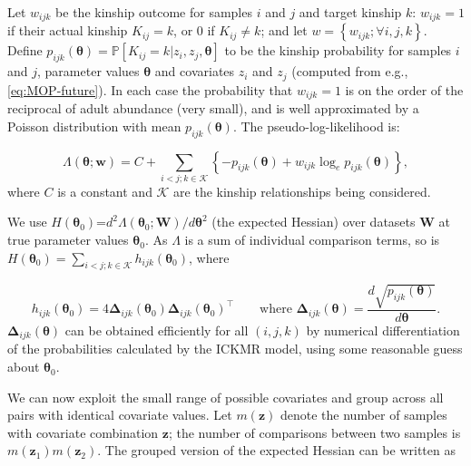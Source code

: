 Let $w_{ijk}$ be the kinship outcome for samples $i$ and $j$ and
target kinship $k$: $w_{ijk}=1$ if their actual kinship $K_{ij}=k$,
or 0 if $K_{ij}\neq k$; and let $w=\left\{ w_{ijk};\forall i,j,k\right\} $.
Define $p_{ijk}\left(\boldsymbol{\theta}\right)=\mathbb{P}\left[K_{ij}=k\vert z_{i},z_{j},\boldsymbol{\theta}\right]$
to be the kinship probability for samples $i$ and $j$, parameter
values $\boldsymbol{\theta}$ and covariates $z_{i}$ and $z_{j}$
(computed from e.g., \eqref{eq:MOP-future}). In each case the probability
that $w_{ijk}=1$ is on the order of the reciprocal of adult abundance
(very small), and is well approximated by a Poisson distribution with
mean $p_{ijk}\left(\boldsymbol{\theta}\right)$. The pseudo-log-likelihood
is:

\[
\Lambda\left(\boldsymbol{\theta};\mathbf{w}\right)=C+\sum_{i<j;k\in\mathcal{K}}\left\{ -p_{ijk}\left(\boldsymbol{\theta}\right)+w_{ijk}\log_{e}p_{ijk}\left(\boldsymbol{\theta}\right)\right\} ,
\]
where $C$ is a constant and $\mathcal{K}$ are the kinship relationships
being considered.

We use $H\left(\boldsymbol{\theta}_{0}\right)$=$d^{2}\Lambda\left(\boldsymbol{\theta}_{0};\mathbf{W}\right)/d\boldsymbol{\theta}^{2}$
(the expected Hessian) over datasets $\mathbf{W}$ at true parameter
values $\boldsymbol{\theta}_{0}$. As $\Lambda$ is a sum of individual
comparison terms, so is $H\left(\boldsymbol{\theta}_{0}\right)=\sum_{i<j;k\in\mathcal{K}}h_{ijk}\left(\boldsymbol{\theta}_{0}\right)$,
where

\[
h_{ijk}\left(\boldsymbol{\theta}_{0}\right)=4\boldsymbol{\Delta}_{ijk}\left(\boldsymbol{\theta}_{0}\right)\boldsymbol{\Delta}_{ijk}\left(\boldsymbol{\theta}_{0}\right)^{\top}\qquad\text{where }\boldsymbol{\Delta}_{ijk}\left(\boldsymbol{\theta}\right)=\frac{d\sqrt{p_{ijk}\left(\boldsymbol{\theta}\right)}}{d\boldsymbol{\theta}}.
\]
$\boldsymbol{\Delta}_{ijk}\left(\boldsymbol{\theta}\right)$ can be
obtained efficiently for all $(i,j,k)$ by numerical differentiation
of the probabilities calculated by the ICKMR model, using some reasonable
guess about $\boldsymbol{\theta}_{0}$. 

We can now exploit the small range of possible covariates and group
across all pairs with identical covariate values. Let $m(\mathbf{z})$
denote the number of samples with covariate combination $\mathbf{z}$;
the number of comparisons between two samples is $m\left(\mathbf{z}_{1}\right)m\left(\mathbf{z}_{2}\right)$.
The grouped version of the expected Hessian can be written as 

